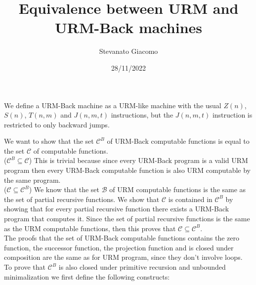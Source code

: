 \documentclass[a4paper, 12pt]{article}
\title{Equivalence between URM and URM-Back machines}
\author{Stevanato Giacomo}
\date{28/11/2022}
\begin{document}
    \maketitle

    We define a URM-Back machine as a URM-like machine with the usual $Z(n)$, $S(n)$, $T(n, m)$ and $J(n, m, t)$ instructions, but the $J(n, m, t)$ instruction is restricted to only backward jumps.
    
    We want to show that the set $\mathcal{C}^B$ of URM-Back computable functions is equal to the set $\mathcal{C}$ of computable functions.
    \\[1em]
    ($\mathcal{C}^B \subseteq \mathcal{C}$)
    This is trivial because since every URM-Back program is a valid URM program then every URM-Back computable function is also URM computable by the same program.
    \\[1em] 
    ($\mathcal{C} \subseteq \mathcal{C}^B$)
    We know that the set $\mathcal{B}$ of URM computable functions is the same as the set of partial recursive functions. We show that $\mathcal{C}$ is contained in $\mathcal{C}^B$ by showing that for every partial recursive function there exists a URM-Back program that computes it. Since the set of partial recursive functions is the same as the URM computable functions, then this proves that $\mathcal{C} \subseteq \mathcal{C}^B$. \\
    The proofs that the set of URM-Back computable functions contains the zero function, the successor function, the projection function and is closed under composition are the same as for URM program, since they don't involve loops. \\
    To prove that $\mathcal{C}^B$ is also closed under primitive recursion and unbounded minimalization we first define the following constructs:
\end{document}
